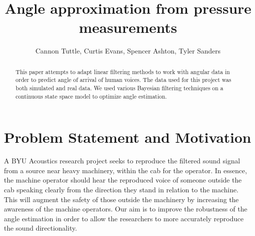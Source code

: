 \documentclass[11pt]{amsart}
\begin{document}
\title{Angle approximation from pressure measurements}
\author{Cannon Tuttle, Curtis Evans, Spencer Ashton, Tyler Sanders}

\date{}

\maketitle

\begin{abstract}
    This paper attempts to adapt linear filtering methods to work with angular data in order to predict angle of arrival of human voices. The data used for this project was both simulated and real data. We used various Bayesian filtering techniques on a continuous state space model to optimize angle estimation.
\end{abstract}

\section{Problem Statement and Motivation}
A BYU Acoustics research project seeks to reproduce the filtered sound signal from a source near heavy machinery, within the cab for the operator. In essence, 
the machine operator should hear the reproduced voice of someone outside the cab speaking clearly from the direction they stand in relation to the machine. This 
will augment the safety of those outside the machinery by increasing the awareness of the machine operators. Our aim is to improve the robustness of the angle 
estimation in order to allow the researchers to more accurately reproduce the sound directionality.
\end{document}
